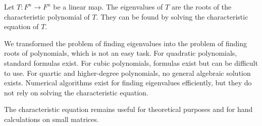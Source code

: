 \begin{conclusion*}\label{conc:eigenvalues-roots} Let $T: F^n \to F^n$ be a
linear map. The eigenvalues of $T$ are the roots of the characteristic
polynomial of $T$. They can be found by solving the characteristic equation of
$T$. \end{conclusion*}

\begin{note} We transformed the problem of finding eigenvalues into the problem
of finding roots of polynomials, which is not an easy task. For quadratic
polynomials, standard formulas exist. For cubic polynomials, formulas exist but
can be difficult to use. For quartic and higher-degree polynomials, no general
algebraic solution exists. Numerical algorithms exist for finding eigenvalues
efficiently, but they do not rely on solving the characteristic equation.
\end{note}

\begin{note} The characteristic equation remains useful for theoretical
purposes and for hand calculations on small matrices. \end{note}